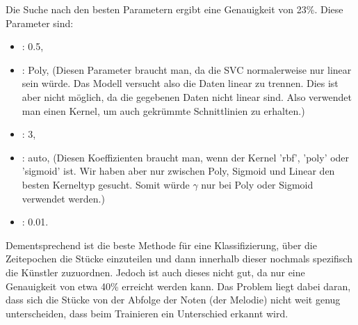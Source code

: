 Die Suche nach den besten Parametern ergibt eine Genauigkeit von 23\%. Diese Parameter sind:
\begin{itemize}
  \item[\textbf{C}]: 0.5, 
  \item[\textbf{Kernel}]: Poly, (Diesen Parameter braucht man, da die SVC normalerweise nur linear sein würde. Das Modell versucht also die Daten linear zu trennen. Dies ist aber nicht möglich, da die gegebenen Daten nicht linear sind. Also verwendet man einen Kernel, um auch gekrümmte Schnittlinien zu erhalten.)
  \item[\textbf{Degree}]: 3, 
  \item[\textbf{Gamma}]: auto, (Diesen Koeffizienten braucht man, wenn der Kernel 'rbf', 'poly' oder 'sigmoid' ist. Wir haben aber nur zwischen Poly, Sigmoid und Linear den besten Kerneltyp gesucht. Somit würde $\gamma$ nur bei Poly oder Sigmoid verwendet werden.)
  \item[\textbf{Tol}]: 0.01.
\end{itemize}

Dementsprechend ist die beste Methode für eine Klassifizierung, über die Zeitepochen die Stücke einzuteilen und dann innerhalb dieser nochmals spezifisch die Künstler zuzuordnen. Jedoch ist auch dieses nicht gut, da nur eine Genauigkeit von etwa 40\% erreicht werden kann.
Das Problem liegt dabei daran, dass sich die Stücke von der Abfolge der Noten (der Melodie) nicht weit genug unterscheiden, dass beim Trainieren ein Unterschied erkannt wird.
